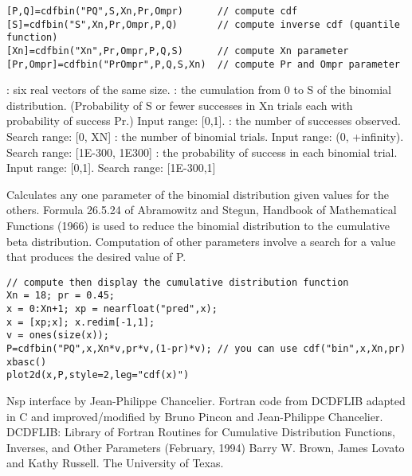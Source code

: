 \begin{mandesc}
\end{mandesc}
\label{cdfbin}
\begin{calling_sequence}
\begin{verbatim}
[P,Q]=cdfbin("PQ",S,Xn,Pr,Ompr)      // compute cdf
[S]=cdfbin("S",Xn,Pr,Ompr,P,Q)       // compute inverse cdf (quantile function)
[Xn]=cdfbin("Xn",Pr,Ompr,P,Q,S)      // compute Xn parameter
[Pr,Ompr]=cdfbin("PrOmpr",P,Q,S,Xn)  // compute Pr and Ompr parameter
\end{verbatim}
\end{calling_sequence}
\begin{parameters}
  \begin{varlist}
    : six real vectors of the same size.
    : the cumulation from 0 to S of the binomial distribution. (Probability of S or fewer successes in Xn trials each with probability of success Pr.) Input range: [0,1].
    : the number of successes observed. Search range: [0, XN]
    : the number of binomial trials. Input range: (0, +infinity). Search range: [1E-300, 1E300]
    : the probability of success in each binomial trial. Input range: [0,1]. Search range: [1E-300,1]
  \end{varlist}
\end{parameters}

\begin{mandescription}
  Calculates any one parameter of the binomial distribution given values 
  for the others. Formula  26.5.24 of  Abramowitz and Stegun,  Handbook   of
  Mathematical   Functions (1966) is used  to reduce the  binomial
  distribution  to  the  cumulative beta distribution.
  Computation of other parameters involve a search for a value that
  produces  the desired  value  of P.
\end{mandescription}

\begin{examples}
\begin{Verbatim}
// compute then display the cumulative distribution function
Xn = 18; pr = 0.45;
x = 0:Xn+1; xp = nearfloat("pred",x);
x = [xp;x]; x.redim[-1,1]; 
v = ones(size(x));
P=cdfbin("PQ",x,Xn*v,pr*v,(1-pr)*v); // you can use cdf("bin",x,Xn,pr)
xbasc()
plot2d(x,P,style=2,leg="cdf(x)")
\end{Verbatim}
\end{examples}

\begin{authors}
  Nsp interface by Jean-Philippe Chancelier. Fortran code from DCDFLIB
  adapted in C and improved/modified by Bruno Pincon and Jean-Philippe Chancelier.  
  DCDFLIB: Library of Fortran Routines for Cumulative Distribution
  Functions, Inverses, and Other Parameters (February, 1994)
  Barry W. Brown, James Lovato and Kathy Russell. The University of Texas.
\end{authors}

